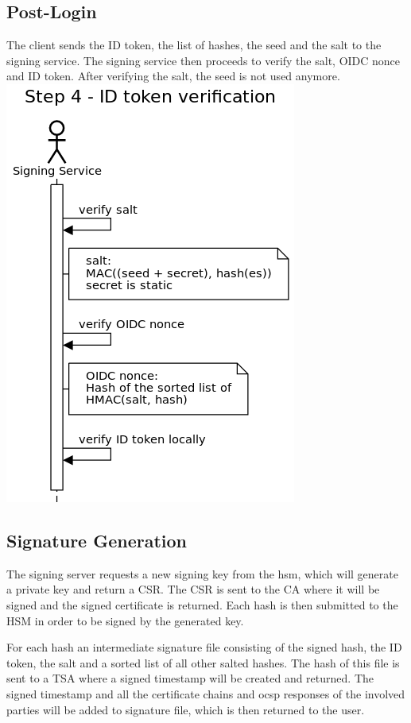 \subsection{Post-Login}
The client sends the ID token, the list of hashes, the seed and the salt to the signing service. The signing service then proceeds to verify the salt, OIDC nonce and ID token.
After verifying the salt, the seed is not used anymore.
\includegraphics[scale=0.5]{images/protocol_step4_id_token_verification.png}

\subsection{Signature Generation}
The signing server requests a new signing key from the hsm, which will generate a private key and return a \gls{CSR}.
The \gls{CSR} is sent to the \gls{CA} where it will be signed and the signed certificate is returned.
Each hash is then submitted to the \gls{HSM} in order to be signed by the generated key.

For each hash an intermediate signature file consisting of the signed hash, the ID token, the salt and a sorted list of all other salted hashes.
The hash of this file is sent to a \gls{TSA} where a signed timestamp will be created and returned.
The signed timestamp and all the certificate chains and ocsp responses of the involved parties will be added to signature file, which is then returned to the user.

